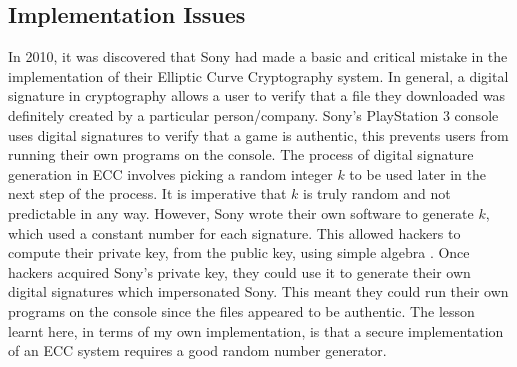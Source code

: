 \documentclass[12pt,a4paper]{article}
\begin{document}
\subsection{Implementation Issues} \noindent
In 2010, it was discovered that Sony had made a basic and critical mistake in the implementation of their Elliptic Curve Cryptography system. 
In general, a digital signature in cryptography allows a user to verify that a file they downloaded was definitely created by a particular person/company. 
Sony's PlayStation 3 console uses digital signatures to verify that a game is authentic, 
this prevents users from running their own programs on the console. 
The process of digital signature generation in ECC involves picking a random integer $k$ to be used later in the next step of the process. 
It is imperative that $k$ is truly random and not predictable in any way. 
However, Sony wrote their own software to generate $k$, which used a constant number for each signature. 
This allowed hackers to compute their private key, from the public key, using simple algebra \cite{hotz2010console}. 
Once hackers acquired Sony's private key, they could use it to generate their own digital signatures which impersonated Sony. 
This meant they could run their own programs on the console since the files appeared to be authentic. 
The lesson learnt here, in terms of my own implementation, 
is that a secure implementation of an ECC system requires a good random number generator. 

%

\end{document}
